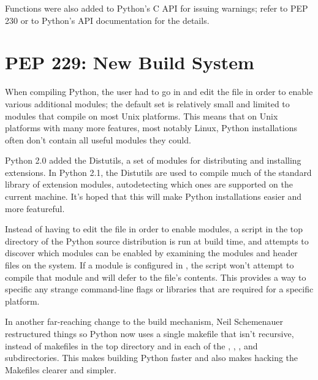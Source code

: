 \documentclass{howto}
\begin{document}
Functions were also added to Python's C API for issuing warnings;
refer to PEP 230 or to Python's API documentation for the details.

\begin{seealso} 



\end{seealso}
    
\section{PEP 229: New Build System}

When compiling Python, the user had to go in and edit the
 file in order to enable various additional
modules; the default set is relatively small and limited to modules
that compile on most Unix platforms.  This means that on Unix
platforms with many more features, most notably Linux, Python
installations often don't contain all useful modules they could.

Python 2.0 added the Distutils, a set of modules for distributing and
installing extensions.  In Python 2.1, the Distutils are used to
compile much of the standard library of extension modules,
autodetecting which ones are supported on the current machine.  It's
hoped that this will make Python installations easier and more
featureful.

Instead of having to edit the  file in order to
enable modules, a  script in the top directory of the
Python source distribution is run at build time, and attempts to
discover which modules can be enabled by examining the modules and
header files on the system.  If a module is configured in
, the  script won't attempt to
compile that module and will defer to the  file's
contents.  This provides a way to specific any strange command-line
flags or libraries that are required for a specific platform.

In another far-reaching change to the build mechanism, Neil
Schemenauer restructured things so Python now uses a single makefile
that isn't recursive, instead of makefiles in the top directory and in
each of the , , , and
 subdirectories.  This makes building Python faster
and also makes hacking the Makefiles clearer and simpler.
\end{document}
